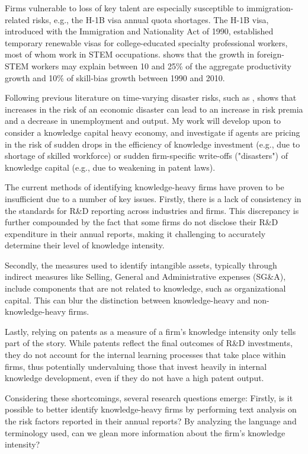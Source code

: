 \documentclass[12pt, letterpaper]{article}
\begin{document}
Firms vulnerable to loss of key talent are especially susceptible to immigration-related risks, e.g., the H-1B visa annual quota shortages. The H-1B visa, introduced with the Immigration and Nationality Act of 1990, established temporary renewable visas for college-educated specialty professional workers, most of whom work in STEM occupations. \citep{Peri2015-qt} shows that the growth in foreign-STEM workers may explain between 10 and 25\% of the aggregate productivity growth and 10\% of skill-bias growth between 1990 and 2010.

Following previous literature on time-varying disaster risks, such as \citep{Gabaix2012-kw, Barro2006-pt, Rietz1988-ds}, \citep{Gourio2012-nt} shows that increases in the risk of an economic disaster can lead to an increase in risk premia and a decrease in unemployment and output. My work will develop upon \citep{Gourio2012-nt} to consider a knowledge capital heavy economy, and investigate if agents are pricing in the risk of sudden drops in the efficiency of knowledge investment (e.g., due to shortage of skilled workforce) or sudden firm-specific write-offs ("disasters") of knowledge capital (e.g., due to weakening in patent laws).

The current methods of identifying knowledge-heavy firms have proven to be insufficient due to a number of key issues. Firstly, there is a lack of consistency in the standards for R\&D reporting across industries and firms. This discrepancy is further compounded by the fact that some firms do not disclose their R\&D expenditure in their annual reports, making it challenging to accurately determine their level of knowledge intensity.

Secondly, the measures used to identify intangible assets, typically through indirect measures like Selling, General and Administrative expenses (SG\&A), include components that are not related to knowledge, such as organizational capital. This can blur the distinction between knowledge-heavy and non-knowledge-heavy firms.

Lastly, relying on patents as a measure of a firm's knowledge intensity only tells part of the story. While patents reflect the final outcomes of R\&D investments, they do not account for the internal learning processes that take place within firms, thus potentially undervaluing those that invest heavily in internal knowledge development, even if they do not have a high patent output.

Considering these shortcomings, several research questions emerge: Firstly, is it possible to better identify knowledge-heavy firms by performing text analysis on the risk factors reported in their annual reports? By analyzing the language and terminology used, can we glean more information about the firm's knowledge intensity?
\end{document}
